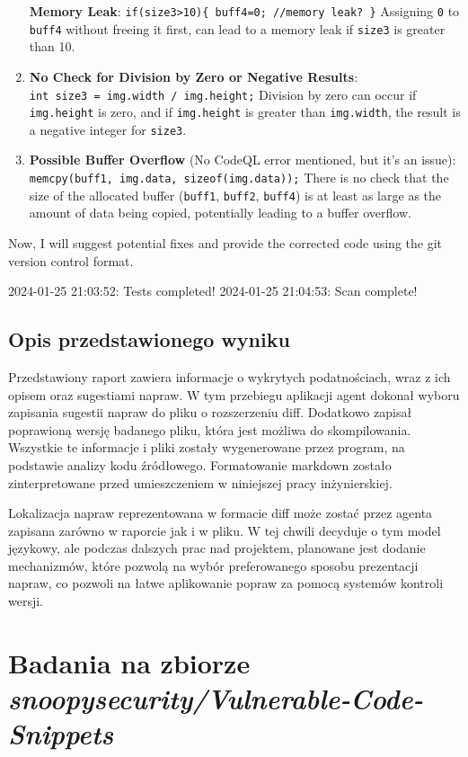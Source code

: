 \begin{adjustwidth}
\begin{tcolorbox}[breakable, colback=gray!10!white,colframe=gray!50!black,title=Wynik działania programu w formacie Markdown, left=2mm, right=2mm, top=1mm, bottom=1mm]
\begin{enumerate}
  \textbf{Memory Leak}:
  \texttt{if(size3\textgreater{}10)\{\ buff4=0;\ //memory\ leak?\ \}}
  Assigning \texttt{0} to \texttt{buff4} without freeing it first, can
  lead to a memory leak if \texttt{size3} is greater than 10.
\item
  \textbf{No Check for Division by Zero or Negative Results}:
  \texttt{int\ size3\ =\ img.width\ /\ img.height;} Division by zero can
  occur if \texttt{img.height} is zero, and if \texttt{img.height} is
  greater than \texttt{img.width}, the result is a negative integer for
  \texttt{size3}.
\item
  \textbf{Possible Buffer Overflow} (No CodeQL error mentioned, but it's
  an issue): \texttt{memcpy(buff1,\ img.data,\ sizeof(img.data));} There
  is no check that the size of the allocated buffer (\texttt{buff1},
  \texttt{buff2}, \texttt{buff4}) is at least as large as the amount of
  data being copied, potentially leading to a buffer overflow.
\end{enumerate}

Now, I will suggest potential fixes and provide the corrected code using
the git version control format.

2024-01-25 21:03:52: Tests completed! 2024-01-25 21:04:53: Scan complete!
\end{tcolorbox}
\end{adjustwidth}
\subsection{Opis przedstawionego wyniku}

Przedstawiony raport zawiera informacje o wykrytych podatnościach, wraz z ich opisem oraz sugestiami napraw. W tym przebiegu aplikacji agent dokonał wyboru zapisania sugestii napraw do pliku o rozszerzeniu diff. Dodatkowo zapisał poprawioną wersję badanego pliku, która jest możliwa do skompilowania. Wszystkie te informacje i pliki zostały wygenerowane przez program, na podstawie analizy kodu źródłowego. Formatowanie markdown zostało zinterpretowane przed umieszczeniem w niniejszej pracy inżynierskiej.

Lokalizacja napraw reprezentowana w formacie diff może zostać przez agenta zapisana zarówno w raporcie jak i w pliku. W tej chwili decyduje o tym model językowy, ale podczas dalszych prac nad projektem, planowane jest dodanie mechanizmów, które pozwolą na wybór preferowanego sposobu prezentacji napraw, co pozwoli na łatwe aplikowanie popraw za pomocą systemów kontroli wersji.
\newpage
\section{Badania na zbiorze \textit{snoopysecurity/Vulnerable-Code-Snippets}}
\label{sec:badania_na_zbiorze_snoopysecurity}

